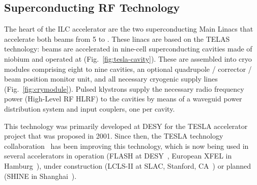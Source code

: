 \subsection{Superconducting RF Technology}


%
%
%
%


The heart of the ILC accelerator are the two superconducting Main Linacs that accelerate both beams from \num{5} to .
These linacs are based on the TELAS technology:
beams are accelerated in  nine-cell superconducting cavities made of niobium and operated at  (Fig.~\ref{fig:tesla-cavity}). These 
 are assembled into cryo modules comprising eight to nine cavities, an optional quadrupole / corrector / beam position monitor unit, and all necessary cryogenic supply lines (Fig.~\ref{fig:crymodule}). 
Pulsed klystrons supply the necessary radio frequency power (High-Level RF HLRF) to the cavities by means of a waveguid power distribution system and input couplers, one per cavity.

This technology was primarily developed at DESY for the TESLA accelerator project that was proposed in 2001.
Since then, the TESLA technology collaboration~\cite{bib:ttc} has been improving this technology, which is now being used in several accelerators in operation (FLASH at DESY~\cite{schreiber_faatz_2015,Vogt:2018wvy}, European XFEL in Hamburg~\cite{bib:xfel}), under construction (LCLS-II at SLAC, Stanford, CA~\cite{bib:lcls-ii}) or planned (SHINE in Shanghai~\cite{Zhao:2018lcl}).


%

